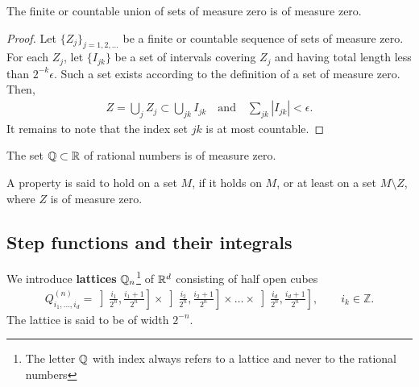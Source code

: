 \begin{lemma}
  The finite or countable union of sets of measure zero is of measure
  zero.
\end{lemma}

\begin{proof}
  Let $\{Z_j\}_{j=1,2,\dots}$ be a finite or countable sequence of
  sets of measure zero. For each $Z_j$, let $\{I_{jk}\}$ be a set of
  intervals covering $Z_j$ and having total length less than
  $2^{-k}\epsilon$. Such a set exists according to the definition of
  a set of measure zero. Then,
  \begin{gather*}
    Z = \bigcup_j Z_j \subset \bigcup_{jk} I_{jk}
    \quad\text{and}\quad
    \sum_{jk} |I_{jk}| < \epsilon.
  \end{gather*}
  It remains to note that the index set $jk$ is at most countable.
\end{proof}

\begin{corollary}
  The set $\mathbb Q\subset \mathbb R$ of rational numbers is of measure zero.
\end{corollary}

\begin{definition}
  \label{def:almost-everywhere}
  A property is said to hold  on a set $M$,
  if it holds on $M$, or at least on a set $M\setminus Z$, where $Z$
  is of measure zero.
\end{definition}

\subsection{Step functions and their integrals}

\begin{definition}
   We introduce \textbf{lattices}
  $\mathbb Q_n$\footnote{The letter $\mathbb Q$ with index always refers to a
    lattice and never to the rational numbers} of $\mathbb R^d$ consisting of
  half open cubes
  \begin{gather*}
    Q^{(n)}_{i_1,\dots,i_d} =
    \left]\tfrac{i_1}{2^n},\tfrac{i_1+1}{2^n}\right]
    \times
    \left]\tfrac{i_2}{2^n},\tfrac{i_2+1}{2^n}\right]
    \times\dots\times
    \left]\tfrac{i_d}{2^n},\tfrac{i_d+1}{2^n}\right],
    \qquad i_k\in\mathbb Z.
  \end{gather*}
  The lattice is said to be of width $2^{-n}$.
\end{definition}

